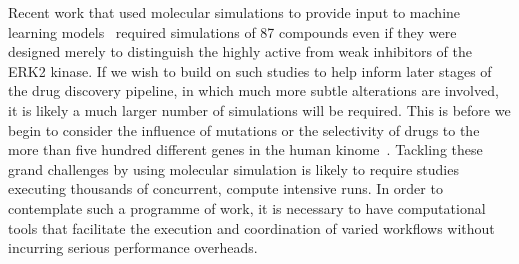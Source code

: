 Recent work that used molecular simulations to provide input to machine
learning models~\cite{Ash2017} required simulations of 87 compounds even if
they were designed merely to distinguish the highly active from weak
inhibitors of the ERK2 kinase. If we wish to build on such studies to help
inform later stages of the drug discovery pipeline, in which much more subtle
alterations are involved, it is likely a much larger number of simulations
will be required. This is before we begin to consider the influence of
mutations or the selectivity of drugs to the more than five hundred different
genes in the human kinome~\cite{Li2016}. Tackling these grand challenges by
using molecular simulation is likely to require studies executing thousands
of concurrent, compute intensive runs. In order to contemplate such a
programme of work, it is necessary to have computational tools that
facilitate the execution and coordination of varied workflows without
incurring serious performance overheads.





